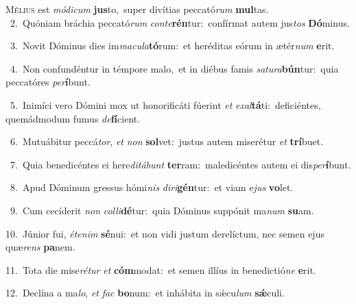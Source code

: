 \lettrine{\initial\textcolor{\initialcolor}{M}}{élius} est \textit{mó}\-\textit{di}\textit{cum} \textbf{jus}\-to,~\star super divítias peccató\textit{rum} \textbf{mul}\-tas.\\
{\numbfont\textcolor{\numbcolor}{~2.}}~Quóniam bráchia peccató\textit{rum} \textit{con}\-\textit{te}\textbf{rén}tur:~\star confírmat autem jus\textit{tos} \textbf{Dó}\-minus.\par
{\numbfont\textcolor{\numbcolor}{~3.}}~Novit Dóminus dies im\-\textit{ma}\-\textit{cu}\textit{la}\textbf{tó}rum:~\star et heréditas eórum in ætér\textit{num} \textbf{e}\-rit.\par
{\numbfont\textcolor{\numbcolor}{~4.}}~Non confundéntur in témpore malo,~\dagger et in diébus famis \textit{sa}\-\textit{tu}\textit{ra}\textbf{bún}tur:~\star quia peccatóres \textit{per}\-\textbf{í}bunt.\par
{\numbfont\textcolor{\numbcolor}{~5.}}~Inimíci vero Dómini mox ut honorificáti fúerint \textit{et} \textit{ex}\-\textit{al}\textbf{tá}ti:~\star deficiéntes, quemádmodum fumus \textit{de}\-\textbf{fí}cient.\par
{\numbfont\textcolor{\numbcolor}{~6.}}~Mutuábitur peccá\-\textit{tor}\-, \textit{et} \textit{non} \textbf{sol}\-vet:~\star justus autem miserétur \textit{et} \textbf{trí}\-buet.\par
{\numbfont\textcolor{\numbcolor}{~7.}}~Quia benedicéntes ei here\-\textit{di}\-\textit{tá}\textit{bunt} \textbf{ter}\-ram:~\star maledicéntes autem ei dis\-\textit{per}\-\textbf{í}bunt.\par
{\numbfont\textcolor{\numbcolor}{~8.}}~Apud Dóminum gressus hómi\textit{nis} \textit{di}\-\textit{ri}\textbf{gén}tur:~\star et viam e\textit{jus} \textbf{vo}\-let.\par
{\numbfont\textcolor{\numbcolor}{~9.}}~Cum cecíderit \textit{non} \textit{col}\-\textit{li}\textbf{dé}tur:~\star quia Dóminus suppónit ma\textit{num} \textbf{su}\-am.\par
{\numbfont\textcolor{\numbcolor}{10.}}~Júnior fui, \textit{ét}\-\textit{e}\textit{nim} \textbf{sé}\-nui:~\star et non vidi justum derelíctum, nec semen ejus quæ\textit{rens} \textbf{pa}\-nem.\par
{\numbfont\textcolor{\numbcolor}{11.}}~Tota die mise\-\textit{ré}\-\textit{tur} \textit{et} \textbf{cóm}\-modat:~\star et semen illíus in benedictió\textit{ne} \textbf{e}\-rit.\par
{\numbfont\textcolor{\numbcolor}{12.}}~Declína a ma\-\textit{lo}\-, \textit{et} \textit{fac} \textbf{bo}\-num:~\star et inhábita in sǽcu\textit{lum} \textbf{sǽ}\-culi.\par
